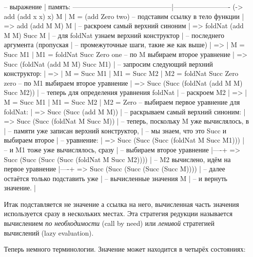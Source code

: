 \begin{code}
--  выражение                               | память:
--------------------------------------------|-------------------------
    (\x -> add (add x x) x) M               | M = (add Zero two)
-- подставим ссылку в тело функции          |
=>  add (add M M) M                         |
-- раскроем самый верхний синоним           |
=>  foldNat (add M M) Succ M                |
-- для foldNat узнаем верхний конструктор   |
-- последнего аргумента (пропуская          |
-- промежуточные шаги, такие же как выше)   |
=>                                          | M  = Succ M1
                                            | M1 = foldNat Succ Zero one
-- по M выбираем второе уравнение           |
=> Succ (foldNat (add M M) Succ M1)         |
-- запросим следующий верхний конструктор:  |
=>                                          | M  = Succ M1
                                            | M1 = Succ M2
                                            | M2 = foldNat Succ Zero zero
-- по M1 выбираем второе уравнение          |
=> Succ (Succ (foldNat (add M M) Succ M2))  | 
-- теперь для определения уравнения foldNat |
-- раскроем M2                              |
=>                                          | M  = Succ M1
                                            | M1 = Succ M2
                                            | M2 = Zero
-- выбираем первое уравнение для foldNat:   |
=> Succ (Succ (add M M))                    |
-- раскрываем самый верхний синоним:        |
=> Succ (Succ (foldNat M Succ M))           |
-- теперь, поскольку M уже вычислялось, в   |
-- памяти уже записан верхний конструктор,  |
-- мы знаем, что это Succ и выбираем второе |
-- уравнение:                               |
=> Succ (Succ (Succ (foldNat M Succ M1)))   |
-- и M1 тоже уже вычислялось, сразу         |
-- выбираем второе уравнение                |----+
=> Succ (Succ (Succ (Succ (foldNat M Succ M2)))) |
-- M2 вычислено, идём на первое уравнение   |----+
=> Succ (Succ (Succ (Succ (Succ M))))       |
-- далее остаётся только подставить уже     |
-- вычисленные значения M                   |
-- и вернуть значение.                      |
\end{code}

Итак подставляется не значение а ссылка на него, 
вычисленная часть значения используется сразу в нескольких
местах. Эта стратегия редукции называется вычислением 
\emph{по необходимости} (call by need) или \emph{ленивой}
стратегией вычислений (lazy evaluation).

Теперь немного терминологии. Значение 
может находится в четырёх состояниях:

